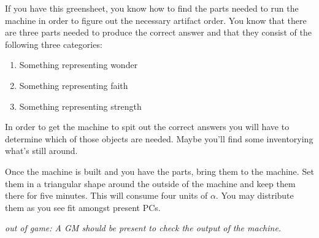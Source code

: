 \documentclass[green]{guildcamp3}
\begin{document}
\name{\gAddPartsMagic{}}


If you have this greensheet, you know how to find the parts needed to run the machine in order to figure out the necessary artifact order. You know that there are three parts needed to produce the correct answer and that they consist of the following three categories:

\begin{enumerate}
	\item Something representing wonder
	\item Something representing faith
	\item Something representing strength
\end{enumerate}

In order to get the machine to spit out the correct answers you will have to determine which of those objects are needed. Maybe you'll find some inventorying what's still around. 

Once the machine is built and you have the parts, bring them to the machine. Set them in a triangular shape around the outside of the machine and keep them there for five minutes. This will consume four units of $\alpha$. You may distribute them as you see fit amongst present PCs.

\emph{out of game: A GM should be present to check the output of the machine.}

\end{document}
